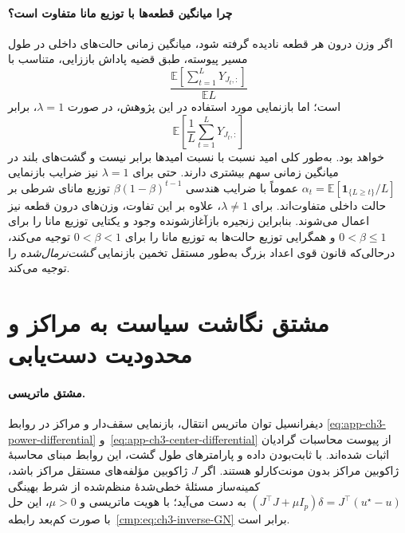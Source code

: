 \paragraph{چرا میانگین قطعه‌ها با توزیع مانا متفاوت است؟}
اگر وزن درون
هر قطعه نادیده
گرفته شود،
میانگین زمانی
حالت‌های داخلی
در طول مسیر
پیوسته،
طبق قضیه
پاداش باززایی،
متناسب با
\[
\frac{
\mathbb E\left[
\sum_{t=1}^{L}
Y_{J_t,:}\right]
}{
\mathbb E L}
\]
است؛ اما بازنمایی
مورد استفاده
در این پژوهش،
در صورت $\lambda=1$،
برابر
\[
\mathbb E\left[
\frac1L\sum_{t=1}^{L}Y_{J_t,:}
\right]
\]
خواهد بود.
به‌طور کلی
امید نسبت
با نسبت امیدها
برابر نیست و
گشت‌های بلند
در میانگین زمانی
سهم بیشتری دارند.
حتی برای
$\lambda=1$ نیز
ضرایب بازنمایی
$\alpha_t
=\mathbb E[
\mathbf1_{\{L\ge t\}}/L]$
عموماً با
ضرایب هندسی
$\beta(1-\beta)^{t-1}$
توزیع مانای
شرطی بر حالت
داخلی متفاوت‌اند.
برای $\lambda\ne1$،
علاوه بر این
تفاوت، وزن‌های
درون قطعه نیز
اعمال می‌شوند.
بنابراین
زنجیره بازآغازشونده
وجود و یکتایی
توزیع مانا را برای
$0<\beta\le1$ و
همگرایی توزیع حالت‌ها
به توزیع مانا را برای
$0<\beta<1$ توجیه می‌کند،
درحالی‌که قانون
قوی اعداد بزرگ
به‌طور مستقل
تخمین بازنمایی
\emph{گشت‌نرمال‌شده}
را توجیه می‌کند.

\section{مشتق نگاشت سیاست به مراکز و محدودیت دست‌یابی}
\label{app:ch3-inverse-policy-proof}

\paragraph{مشتق ماتریسی.}
دیفرانسیل توان ماتریس انتقال، بازنمایی سقف‌دار
و مراکز در روابط
\eqref{eq:app-ch3-power-differential}
و~\eqref{eq:app-ch3-center-differential}
از پیوست محاسبات گرادیان اثبات شده‌اند.
با ثابت‌بودن داده و پارامترهای طول گشت،
این روابط مبنای محاسبهٔ ژاکوبین مراکز
بدون مونت‌کارلو هستند.
اگر $J$ ژاکوبین مؤلفه‌های مستقل مراکز باشد،
کمینه‌ساز مسئلهٔ خطی‌شدهٔ منظم‌شده از شرط بهینگی
$(J^\top J+\mu I_p)\delta=J^\top(u^\star-u)$
به دست می‌آید؛ با هویت ماتریسی و $\mu>0$،
این حل با صورت کم‌بعد
رابطه~\eqref{cmp:eq:ch3-inverse-GN} برابر است.

